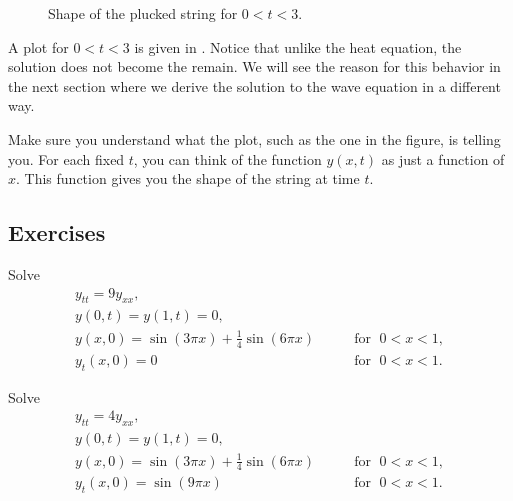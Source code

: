 \documentclass[12pt]{book}
\begin{document}
\begin{example}
\begin{figure}[h!t]
\capstart
\begin{center}
\caption{Shape of the plucked string for $0 < t < 3$.\label{wave:pluckedexfig}}
\end{center}
\end{figure}

A plot for $0 < t < 3$ is given in .  Notice
that unlike the heat equation, the solution does not become
the  remain.  We will see the reason for this behavior in the
next section where we derive the solution to the wave equation in a different
way.

Make sure you understand what the plot, such as the one in the figure, is
telling you.  For each fixed $t$, you can think of the function 
$y(x,t)$ as just a function of $x$.  This function gives you the shape of the
string at time $t$.
\end{example}

\subsection{Exercises}

\begin{exercise}
Solve
\begin{equation*}
\begin{array}{ll}
y_{tt} = 9 y_{xx} , &  \\
y(0,t) = y(1,t) = 0 , &  \\
y(x,0) = \sin (3\pi x) + \frac{1}{4} \sin (6 \pi x) & \qquad \text{for } \; 0 < x < 1 , \\
y_t(x,0) = 0 & \qquad \text{for } \; 0 < x < 1 .
\end{array}
\end{equation*}
\end{exercise}

\begin{exercise}
Solve
\begin{equation*}
\begin{array}{ll}
y_{tt} = 4 y_{xx} , &  \\
y(0,t) = y(1,t) = 0 , &  \\
y(x,0) = \sin (3\pi x) + \frac{1}{4} \sin (6 \pi x) & \qquad \text{for } \; 0 < x < 1 , \\
y_t(x,0) = \sin (9 \pi x) & \qquad \text{for } \; 0 < x < 1 .
\end{array}
\end{equation*}
\end{exercise}
\end{document}
